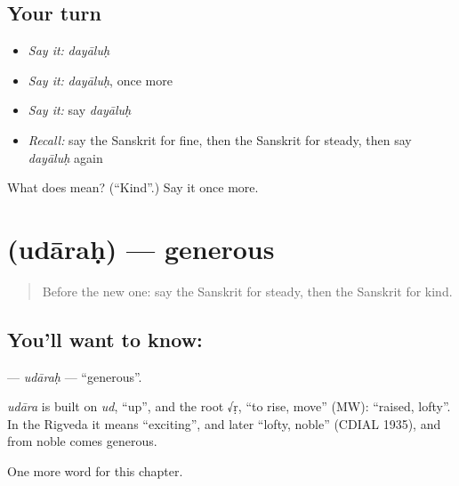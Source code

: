 \subsection*{Your turn}
\begin{itemize}
\raggedright
  \item \emph{Say it:} \emph{dayāluḥ}
  \item \emph{Say it:} \emph{dayāluḥ}, once more
  \item \emph{Say it:} say \emph{dayāluḥ}
  \item \emph{Recall:} say the Sanskrit for fine, then the Sanskrit for steady, then say \emph{dayāluḥ} again
\end{itemize}

\begin{tcolorbox}[breakable,colback=teal!4,colframe=teal!35!black,title={Before you move on}]
What does  mean? (\textquotedblleft{}Kind\textquotedblright{}.) Say it once more.
\end{tcolorbox}
\section[\texorpdfstring{\sk{उदारः} (udāraḥ)}{उदारः (udāraḥ)}]{ (udāraḥ) — generous}

\label{lesson:SA-C187-udarah}



\begin{quote}
Before the new one: say the Sanskrit for steady, then the Sanskrit for kind.
\end{quote}

\subsection*{You'll want to know: }
\textbf{} — \emph{udāraḥ} — \textquotedblleft{}generous\textquotedblright{}.

\begin{cousinweb}
\emph{udāra} is built on \emph{ud}, \textquotedblleft{}up\textquotedblright{}, and the root √ṛ, \textquotedblleft{}to rise, move\textquotedblright{} (MW): \textquotedblleft{}raised, lofty\textquotedblright{}. In the Rigveda it means \textquotedblleft{}exciting\textquotedblright{}, and later \textquotedblleft{}lofty, noble\textquotedblright{} (CDIAL 1935), and from noble comes generous.
\end{cousinweb}

\begin{grammarlens}[title={What you've built}]
One more word for this chapter.
\end{grammarlens}

